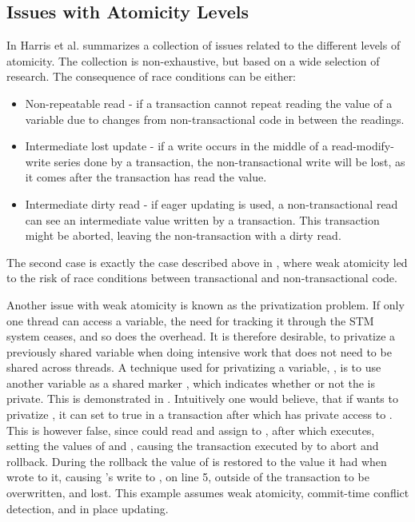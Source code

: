 \subsection{Issues with Atomicity Levels}
In \cite[p. 30-35]{harris2010transactional} Harris et al. summarizes a collection of issues related to the different levels of atomicity. The collection is non-exhaustive, but based on a wide selection of research. The consequence of race conditions can be either:
\begin{itemize}
	\item Non-repeatable read - if a transaction cannot repeat reading the value of a variable due to changes from non-transactional code in between the readings.
	\item Intermediate lost update - if a write occurs in the middle of a read-modify-write series done by a transaction, the non-transactional write will be lost, as it comes after the transaction has read the value.
	\item Intermediate dirty read - if eager updating\cite[p. 53]{dpt907e14trending} is used, a non-transactional read can see an intermediate value written by a transaction. This transaction might be aborted, leaving the non-transaction with a dirty read.
\end{itemize}
The second case is exactly the case described above in , where weak atomicity led to the risk of race conditions between transactional and non-transactional code. 

Another issue with weak atomicity is known as the privatization problem. If only one thread can access a variable, the need for tracking it through the \ac{STM} system ceases, and so does the overhead. It is therefore desirable, to privatize a previously shared variable when doing intensive work that does not need to be shared across threads. A technique used for privatizing a variable, , is to use another variable as a shared marker , which indicates whether or not the  is private. This is demonstrated in . Intuitively one would believe, that if  wants to privatize , it can set  to true in a transaction after which  has private access to . This is however false, since  could read  and assign to , after which  executes, setting the values of  and , causing the transaction executed by  to abort and rollback. During the rollback the value of  is restored to the value it had when  wrote to it, causing 's write to , on line 5, outside of the transaction to be overwritten, and lost. This example assumes weak atomicity, commit-time conflict detection, and in place updating\cite[p. 34]{harris2010transactional}. 

